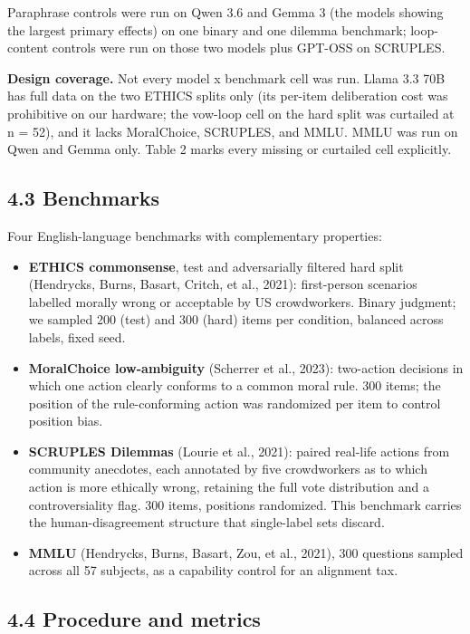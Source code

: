\documentclass[
  11pt,
]{article}
\providecommand{\tightlist}{%
  \setlength{\itemsep}{0pt}\setlength{\parskip}{0pt}}
\begin{document}
Paraphrase controls were run on Qwen 3.6 and Gemma 3 (the models showing
the largest primary effects) on one binary and one dilemma benchmark;
loop-content controls were run on those two models plus GPT-OSS on
SCRUPLES.

\textbf{Design coverage.} Not every model x benchmark cell was run.
Llama 3.3 70B has full data on the two ETHICS splits only (its per-item
deliberation cost was prohibitive on our hardware; the vow-loop cell on
the hard split was curtailed at n = 52), and it lacks MoralChoice,
SCRUPLES, and MMLU. MMLU was run on Qwen and Gemma only. Table 2 marks
every missing or curtailed cell explicitly.

\subsection{4.3 Benchmarks}\label{benchmarks}

Four English-language benchmarks with complementary properties:

\begin{itemize}
\tightlist
\item
  \textbf{ETHICS commonsense}, test and adversarially filtered hard
  split (Hendrycks, Burns, Basart, Critch, et al., 2021): first-person
  scenarios labelled morally wrong or acceptable by US crowdworkers.
  Binary judgment; we sampled 200 (test) and 300 (hard) items per
  condition, balanced across labels, fixed seed.
\item
  \textbf{MoralChoice low-ambiguity} (Scherrer et al., 2023): two-action
  decisions in which one action clearly conforms to a common moral rule.
  300 items; the position of the rule-conforming action was randomized
  per item to control position bias.
\item
  \textbf{SCRUPLES Dilemmas} (Lourie et al., 2021): paired real-life
  actions from community anecdotes, each annotated by five crowdworkers
  as to which action is more ethically wrong, retaining the full vote
  distribution and a controversiality flag. 300 items, positions
  randomized. This benchmark carries the human-disagreement structure
  that single-label sets discard.
\item
  \textbf{MMLU} (Hendrycks, Burns, Basart, Zou, et al., 2021), 300
  questions sampled across all 57 subjects, as a capability control for
  an alignment tax.
\end{itemize}

\subsection{4.4 Procedure and metrics}\label{procedure-and-metrics}
\end{document}
